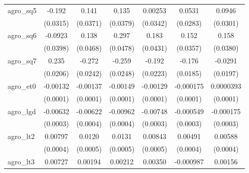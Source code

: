 {\begin{tabular}{l*{6}{c}}
\addlinespace
agro\_sq5            &      -0.192\sym{***}&       0.141\sym{***}&       0.135\sym{***}&     0.00253         &      0.0531         &      0.0946\sym{**} \\
                    &    (0.0315)         &    (0.0371)         &    (0.0379)         &    (0.0342)         &    (0.0283)         &    (0.0301)         \\
\addlinespace
agro\_sq6            &     -0.0923\sym{*}  &       0.138\sym{**} &       0.297\sym{***}&       0.183\sym{***}&       0.152\sym{***}&       0.158\sym{***}\\
                    &    (0.0398)         &    (0.0468)         &    (0.0478)         &    (0.0431)         &    (0.0357)         &    (0.0380)         \\
\addlinespace
agro\_sq7            &       0.235\sym{***}&      -0.272\sym{***}&      -0.259\sym{***}&      -0.192\sym{***}&      -0.176\sym{***}&     -0.0291         \\
                    &    (0.0206)         &    (0.0242)         &    (0.0248)         &    (0.0223)         &    (0.0185)         &    (0.0197)         \\
\addlinespace
agro\_et0            &    -0.00132\sym{***}&    -0.00137\sym{***}&    -0.00149\sym{***}&    -0.00129\sym{***}&   -0.000175\sym{**} &   0.0000393         \\
                    &    (0.0001)         &    (0.0001)         &    (0.0001)         &    (0.0001)         &    (0.0001)         &    (0.0001)         \\
\addlinespace
agro\_lgd            &    -0.00632\sym{***}&    -0.00622\sym{***}&    -0.00962\sym{***}&    -0.00748\sym{***}&   -0.000549\sym{*}  &   -0.000175         \\
                    &    (0.0003)         &    (0.0004)         &    (0.0004)         &    (0.0003)         &    (0.0003)         &    (0.0003)         \\
\addlinespace
agro\_lt2            &     0.00797\sym{***}&      0.0120\sym{***}&      0.0131\sym{***}&     0.00843\sym{***}&     0.00491\sym{***}&     0.00588\sym{***}\\
                    &    (0.0004)         &    (0.0005)         &    (0.0005)         &    (0.0005)         &    (0.0004)         &    (0.0004)         \\
\addlinespace
agro\_lt3            &     0.00727\sym{***}&     0.00194\sym{***}&     0.00212\sym{***}&     0.00350\sym{***}&   -0.000987\sym{***}&     0.00156\sym{***}\\

\end{tabular}}
